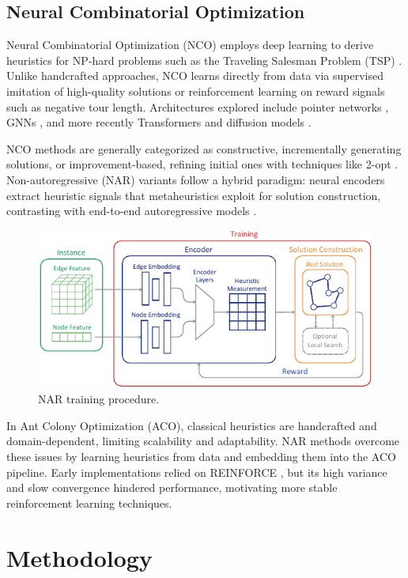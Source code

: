 \documentclass[a4paper,conference]{IEEEtran}
\begin{document}
\subsection{Neural Combinatorial Optimization}
Neural Combinatorial Optimization (NCO) employs deep learning to derive heuristics for NP-hard problems such as the Traveling Salesman Problem (TSP) \cite{MLCO}. Unlike handcrafted approaches, NCO learns directly from data via supervised imitation of high-quality solutions or reinforcement learning on reward signals such as negative tour length. Architectures explored include pointer networks \cite{pointernetwork}, GNNs \cite{gnn}, and more recently Transformers \cite{transformer} and diffusion models \cite{difusco}.

NCO methods are generally categorized as constructive, incrementally generating solutions, or improvement-based, refining initial ones with techniques like 2-opt \cite{NCO}. Non-autoregressive (NAR) variants follow a hybrid paradigm: neural encoders extract heuristic signals that metaheuristics exploit for solution construction, contrasting with end-to-end autoregressive models \cite{RL4CO}.

\begin{figure}[H]
  \centering
  \includegraphics[width=\linewidth]{DACO.pdf}
  \caption{NAR training procedure.}
  \label{fig:DACO}
\end{figure}

In Ant Colony Optimization (ACO), classical heuristics are handcrafted and domain-dependent, limiting scalability and adaptability. NAR methods overcome these issues by learning heuristics from data and embedding them into the ACO pipeline. Early implementations relied on REINFORCE \cite{REINFORCE}, but its high variance and slow convergence hindered performance, motivating more stable reinforcement learning techniques.

\section{Methodology}
\end{document}

